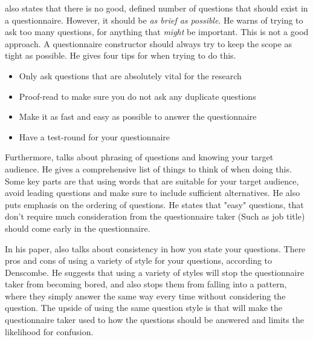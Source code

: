 \documentclass{article}
\begin{document}
\cite{denscombe} also states that there is no good, defined number of questions that should exist in a questionnaire. However, it should be
\textit{as brief as possible}. He warns of trying to ask too many questions, for anything that \textit{might} be important. This is not a good approach. A questionnaire constructor should always try to keep the scope as tight as possible. He gives four tips for when trying to do this.
\begin{itemize}
\item Only ask questions that are absolutely vital for the research
\item Proof-read to make sure you do not ask any duplicate questions
\item Make it as fast and easy as possible to answer the questionnaire
\item Have a test-round for your questionnaire
\end{itemize}
Furthermore, \cite{denscombe} talks about phrasing of questions and knowing your target audience. He gives a comprehensive list of things to think of when doing this. Some key parts are that using words that are suitable for your target audience, avoid leading questions and make sure to include sufficient alternatives. He also puts emphasis on the ordering of questions. He states that "easy" questions, that don't require much consideration from the questionnaire taker (Such as job title) should come early in the questionnaire.

In his paper, \cite{denscombe} also talks about consistency in how you state your questions.
There pros and cons of using a variety of style for your questions, according to Denscombe. He suggests that using a variety of styles will stop the questionnaire taker from becoming bored, and also stops them from falling into a pattern, where they simply answer the same way every time without considering the question. The upside of using the same question style is that will make the questionnaire taker used to how the questions should be answered and limits the likelihood for confusion.
\end{document}
